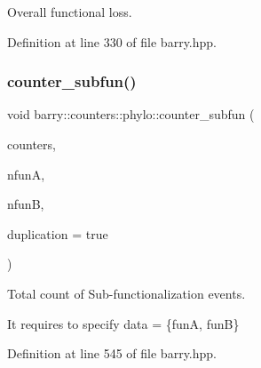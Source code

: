 Overall functional loss. 



Definition at line 330 of file barry.\+hpp.

\mbox{\label{namespacebarry_1_1counters_1_1phylo_ad36131d4405a758fa200fd29932f49ea}} 
\subsubsection{\texorpdfstring{counter\+\_\+subfun()}{counter\_subfun()}}
{\footnotesize\ttfamily void barry\+::counters\+::phylo\+::counter\+\_\+subfun (\begin{DoxyParamCaption}\item[{\hyperlink{namespacebarry_1_1counters_1_1phylo_a4e401ffe66d04091343dcffaf915f8c3}{Phylo\+Counters} $\ast$}]{counters,  }\item[{\hyperlink{namespacebarry_a11dfc53ddb4672278319aa04f1e09a6c}{uint}}]{nfunA,  }\item[{\hyperlink{namespacebarry_a11dfc53ddb4672278319aa04f1e09a6c}{uint}}]{nfunB,  }\item[{bool}]{duplication = {\ttfamily true} }\end{DoxyParamCaption})\hspace{0.3cm}{\ttfamily [inline]}}



Total count of Sub-\/functionalization events. 

It requires to specify data = \{funA, funB\} 

Definition at line 545 of file barry.\+hpp.

